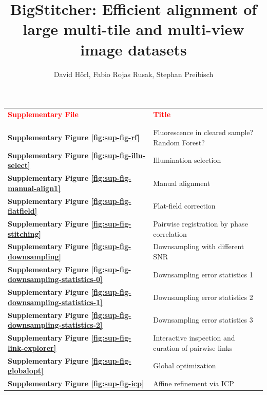 \documentclass[]{spie}  %
\title{BigStitcher: Efficient alignment of large multi-tile and multi-view image datasets}
\author{David H{\"o}rl, Fabio Rojas Rusak, Stephan Preibisch
}
\newcommand\tablespace{\vspace{2.5mm}}
\begin{document}
\maketitle

\setcounter{page}{1}


\hspace{20mm}

\begin{table}[h!]
\center
{
\fontsize{12pt}{11pt}\selectfont
\center
\begin{tabular}{lp{11cm}}
\textbf{\textcolor{red}{Supplementary File}} & \textbf{\textcolor{red}{Title}}\\ \\
\hline
\\
\textbf{Supplementary Figure \ref{fig:sup-fig-rf}} & Fluorescence in cleared sample? Random Forest? \tablespace \\
\textbf{Supplementary Figure \ref{fig:sup-fig-illu-select}} & Illumination selection \tablespace \\
\textbf{Supplementary Figure \ref{fig:sup-fig-manual-align1}} &  Manual alignment \tablespace \\
\textbf{Supplementary Figure \ref{fig:sup-fig-flatfield}} & Flat-field correction \tablespace \\
\textbf{Supplementary Figure \ref{fig:sup-fig-stitching}} & Pairwise registration by phase correlation \tablespace \\
\textbf{Supplementary Figure \ref{fig:sup-fig-downsampling}} & Downsampling with different SNR \tablespace \\
\textbf{Supplementary Figure \ref{fig:sup-fig-downsampling-statistics-0}} & Downsampling error statistics 1 \tablespace \\
\textbf{Supplementary Figure \ref{fig:sup-fig-downsampling-statistics-1}} & Downsampling error statistics 2 \tablespace \\
\textbf{Supplementary Figure \ref{fig:sup-fig-downsampling-statistics-2}} & Downsampling error statistics 3 \tablespace \\
\textbf{Supplementary Figure \ref{fig:sup-fig-link-explorer}} & Interactive inspection and curation of pairwise links \tablespace \\
\textbf{Supplementary Figure \ref{fig:sup-fig-globalopt}} & Global optimization \tablespace \\
\textbf{Supplementary Figure \ref{fig:sup-fig-icp}} & Affine refinement via ICP \tablespace \\

\end{tabular}}
\end{table}
\end{document}
